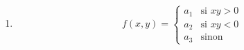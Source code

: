 \begin{exercice}
\begin{multicols}{2}
\begin{enumerate}
	\item 
	\begin{equation}
		f(x,y)=
			\begin{cases}
		a_1	&	\text{si $xy>0$}\\
		a_2	&	 \text{si $xy<0$}\\
		a_3	&	 \text{sinon}
	\end{cases}
	\end{equation}
\end{enumerate}
\end{multicols}

\end{exercice}
